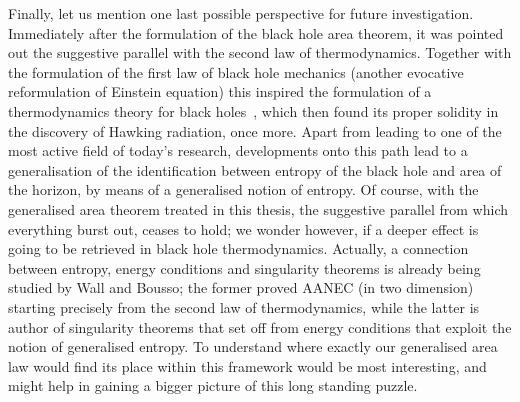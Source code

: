 Finally, let us mention one last possible perspective for future investigation. Immediately after the formulation of the black hole area theorem, it was pointed out the suggestive parallel with the second law of thermodynamics. Together with the formulation of the first law of black hole mechanics (another evocative reformulation of Einstein equation) this inspired the formulation of a thermodynamics theory for black holes~\cite[]{bardeen1973four}, which then found its proper solidity in the discovery of Hawking radiation, once more.
Apart from leading to one of the most active field of today's research, developments onto this path lead to a generalisation of the identification between entropy of the black hole and area of the horizon, by means of a generalised notion of entropy.
Of course, with the generalised area theorem treated in this thesis, the suggestive parallel from which everything burst out, ceases to hold; we wonder however, if a deeper effect is going to be retrieved in black hole thermodynamics. 
Actually, a connection between entropy, energy conditions and singularity theorems is already being studied by Wall and Bousso; the former proved AANEC (in two dimension) starting precisely from the second law of thermodynamics, while the latter is author of singularity theorems that set off from energy conditions that exploit the notion of generalised entropy. To understand where exactly our generalised area law would find its place within this framework would be most interesting, and might help in gaining a bigger picture of this long standing puzzle.